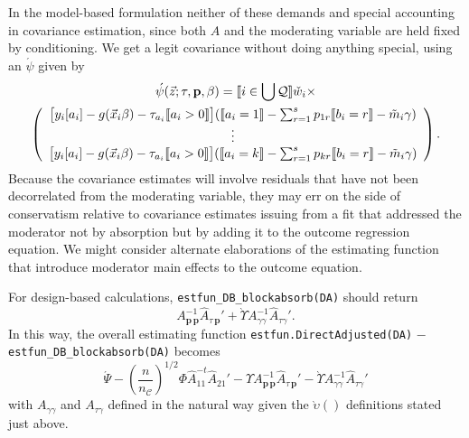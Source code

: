 \documentclass{article}
\DeclarePairedDelimiter{\indicator}{\llbracket}{\rrbracket}
\newcommand{\owt}[1][{[a_i]}]{\ensuremath{\check{w}_{i#1}}}
\newcommand{\AbsorbInterceptsEF}{\Upsilon}
\newcommand{\absorbModeratorEF}{\grave{\upsilon}}
\newcommand{\AbsorbModeratorEF}{\grave{\Upsilon}}
\begin{document}
In the model-based formulation neither of these demands and special
accounting in covariance estimation, since both $A$ and the moderating
variable are held fixed by conditioning. We get a legit covariance
without doing anything special, using an $\acute{\psi}$ given by
\begin{multline*}
  \acute{\psi}(\vec{z}; \tau, \mathbf{p}, \beta) =
    \indicator{i \in \bigcup \mathcal{Q}}\owt[] \times \\
\left(
                                             \begin{array}{c}                                               
           \big[y_{i}[a_{i}]
                                               -
                                               g(\vec{x}_{i}\beta)-\tau_{a_{i}}\indicator{a_{i}>0}\big](
                                               \indicator{a_{i}=1} -
                                               \sum_{r=1}^{s}p_{1r}\indicator{b_{i}=r}
                                               - \tilde{m}_{i}\gamma)\\
                  \vdots \\
{}           \big[y_{i}[a_{i}]
                                               - g(\vec{x}_{i}\beta) -
                                               \tau_{a_{i}}\indicator{a_{i}>0}\big](\indicator{a_{i}=k}
                                               -
                                               \sum_{r=1}^{s}p_{kr}\indicator{b_{i}=r}
                                               -
                                               \tilde{m}_{i}\gamma)\\
                                             \end{array}
\right) .
\end{multline*}
Because the covariance estimates will
involve residuals that have not been decorrelated from the moderating
variable, they may err on the side of conservatism relative to
covariance estimates issuing from a fit that addressed the moderator
not by absorption but by adding it to the outcome regression
equation. We might consider alternate elaborations of the estimating
function that introduce moderator main effects to the outcome equation.

For design-based calculations, \texttt{estfun\_DB\_blockabsorb(DA)}
 should return
 \begin{equation*}
   A_{\mathbf{p}\,\mathbf{p}}^{-1}\hat{A}_{\tau\,\mathbf{p}}' +
  \AbsorbModeratorEF{}A_{\gamma \gamma}^{-1}\hat{A}_{\tau \gamma}'.
 \end{equation*}
 In this way, the overall estimating function
 \texttt{estfun.DirectAdjusted(DA)} $-$ \texttt{estfun\_DB\_blockabsorb(DA)} 
 becomes
 \begin{equation}
   \label{eq:19}
  \acute{\Psi} -
  \left(\frac{n}{n_{\mathcal{C}}}\right)^{1/2}\Phi
  \hat{A}_{11}^{-t}\hat{A}_{21}' - \AbsorbInterceptsEF{}
  A_{\mathbf{p}\,\mathbf{p}}^{-1}\hat{A}_{\tau\,\mathbf{p}}' -
  \AbsorbModeratorEF{}A_{\gamma \gamma}^{-1}\hat{A}_{\tau \gamma}'
 \end{equation}
with $A_{\gamma \gamma}$ and $A_{\tau \gamma}$ defined in the natural
way given the $\absorbModeratorEF()$ definitions stated just above. 
\end{document}
